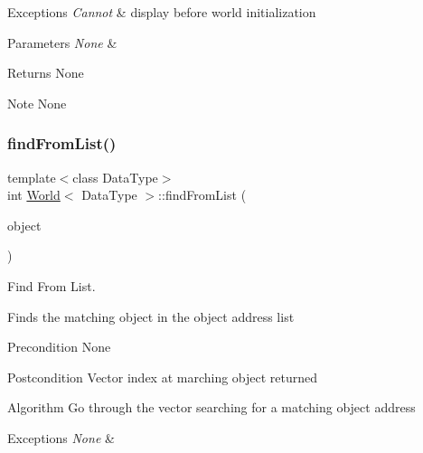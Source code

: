 \begin{DoxyExceptions}{Exceptions}
{\em Cannot} & display before world initialization\\
\hline
\end{DoxyExceptions}

\begin{DoxyParams}{Parameters}
{\em None} & \\
\hline
\end{DoxyParams}
\begin{DoxyReturn}{Returns}
None
\end{DoxyReturn}
\begin{DoxyNote}{Note}
None 
\end{DoxyNote}
\hypertarget{class_world_ae18fad4d3721145e02dd9e2e8e63f0c4}{}\label{class_world_ae18fad4d3721145e02dd9e2e8e63f0c4} 
\subsubsection{\texorpdfstring{find\+From\+List()}{findFromList()}}
{\footnotesize\ttfamily template$<$class Data\+Type$>$ \\
int \hyperlink{class_world}{World}$<$ Data\+Type $>$\+::find\+From\+List (\begin{DoxyParamCaption}\item[{Data\+Type $\ast$}]{object }\end{DoxyParamCaption})\hspace{0.3cm}{\ttfamily [private]}}



Find From List. 

Finds the matching object in the object address list

\begin{DoxyPrecond}{Precondition}
None
\end{DoxyPrecond}
\begin{DoxyPostcond}{Postcondition}
Vector index at marching object returned
\end{DoxyPostcond}
\begin{DoxyParagraph}{Algorithm}
Go through the vector searching for a matching object address
\end{DoxyParagraph}

\begin{DoxyExceptions}{Exceptions}
{\em None} & \\
\hline
\end{DoxyExceptions}

